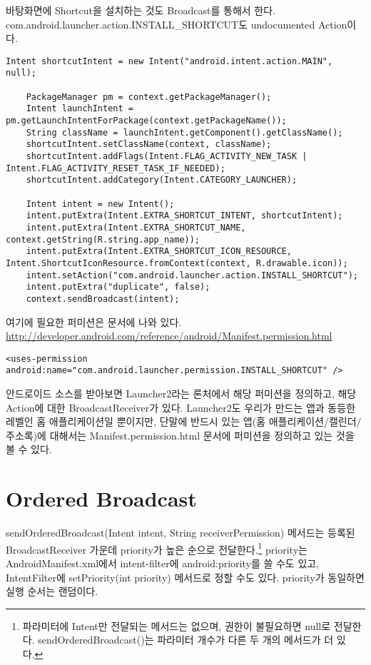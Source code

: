 바탕화면에 Shortcut을 설치하는 것도 Broadcast를 통해서 한다. com.android.launcher.action.INSTALL\_SHORT\-CUT도 undocumented Action이다.
\begin{lstlisting}[frame=single] 
	Intent shortcutIntent = new Intent("android.intent.action.MAIN", null);
		
	PackageManager pm = context.getPackageManager();
	Intent launchIntent = pm.getLaunchIntentForPackage(context.getPackageName());
	String className = launchIntent.getComponent().getClassName();
	shortcutIntent.setClassName(context, className);
	shortcutIntent.addFlags(Intent.FLAG_ACTIVITY_NEW_TASK | Intent.FLAG_ACTIVITY_RESET_TASK_IF_NEEDED);
	shortcutIntent.addCategory(Intent.CATEGORY_LAUNCHER);

	Intent intent = new Intent();
	intent.putExtra(Intent.EXTRA_SHORTCUT_INTENT, shortcutIntent);
	intent.putExtra(Intent.EXTRA_SHORTCUT_NAME, context.getString(R.string.app_name));
	intent.putExtra(Intent.EXTRA_SHORTCUT_ICON_RESOURCE, Intent.ShortcutIconResource.fromContext(context, R.drawable.icon));
	intent.setAction("com.android.launcher.action.INSTALL_SHORTCUT");
	intent.putExtra("duplicate", false);
	context.sendBroadcast(intent);
\end{lstlisting}
여기에 필요한 퍼미션은 문서에 나와 있다.\\
\url{http://developer.android.com/reference/android/Manifest.permission.html}
\begin{verbatim}
<uses-permission android:name="com.android.launcher.permission.INSTALL_SHORTCUT" />
\end{verbatim}

안드로이드 소스를 받아보면 Launcher2라는 론처에서 해당 퍼미션을 정의하고, 해당 Action에 대한 BroadcastReceiver가 있다.
Launcher2도 우리가 만드는 앱과 동등한 레벨인 홈 애플리케이션일 뿐이지만, 단말에 반드시 있는 앱(홈 애플리케이션/캘린더/주소록)에 대해서는 Manifest.permission.html 문서에 퍼미션을 정의하고 있는 것을 볼 수 있다.\\


\section{Ordered Broadcast}
sendOrderedBroadcast(Intent intent, String receiverPermission) 메서드는 등록된 BroadcastReceiver 가운데 priority가 높은 순으로 전달한다.\footnote{파라미터에 Intent만 전달되는 메서드는 없으며, 권한이 불필요하면 null로 전달한다. sendOrderedBroadcast()는 파라미터 개수가 다른 두 개의 메서드가 더 있다.}
priority는 AndroidManifest.xml에서 intent-filter에 android:priority를 쓸 수도 있고, IntentFilter에 setPriority(int priority) 메서드로 정할 수도 있다. priority가 동일하면 실행 순서는 랜덤이다.\\

